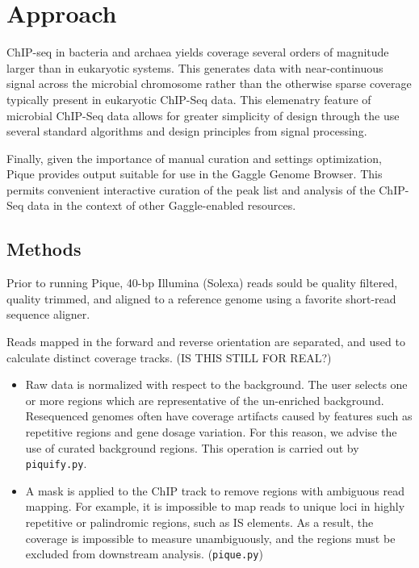 \documentclass{bioinfo}
\begin{document}
{\section{Approach}
ChIP-seq in bacteria and archaea yields coverage several orders of magnitude larger than in eukaryotic systems.  This generates data with near-continuous signal across the microbial chromosome rather than the otherwise sparse coverage typically present in eukaryotic ChIP-Seq data.  This elemenatry feature of microbial ChIP-Seq data allows for greater simplicity of design through the use several standard algorithms and design principles from signal processing.

Finally, given the importance of manual curation and
settings optimization, Pique provides output suitable for use in the
Gaggle Genome Browser. This permits convenient interactive curation of
the peak list and analysis of the ChIP-Seq data in the context of other Gaggle-enabled resources.   






\begin{methods}
\section{Methods}

Prior to running Pique, 40-bp Illumina (Solexa) reads sould be quality filtered, quality trimmed, and aligned to a reference genome using a favorite short-read sequence aligner. 

Reads mapped in the forward and reverse orientation are
separated, and used to calculate distinct coverage tracks. (IS THIS STILL FOR REAL?)

\begin{itemize}

\item Raw data is normalized with respect to the background. The user
  selects one or more regions which are representative of the
  un-enriched background. Resequenced genomes often have coverage
  artifacts caused by features such as repetitive regions and gene
  dosage variation. For this reason, we advise the use of curated
  background regions. This operation is carried out by
  \texttt{piquify.py}.

\item A mask is applied to the ChIP track to remove regions with
  ambiguous read mapping. For example, it is impossible to map reads
  to unique loci in highly repetitive or palindromic regions, such as
  IS elements. As a result, the coverage is impossible to measure
  unambiguously, and the regions must be excluded from downstream
  analysis. (\texttt{pique.py})


\end{itemize}
\end{methods}}
\end{document}
